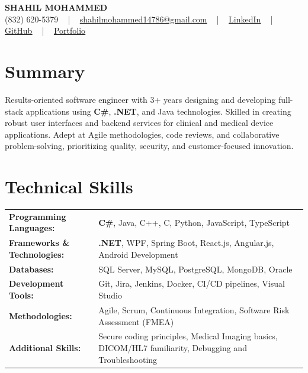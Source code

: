\documentclass[letterpaper,11pt]{article}
\begin{document}
\begin{center}
    {\fontsize{14pt}{12pt}\selectfont \textbf{\MakeUppercase{Shahil Mohammed}}}\\ \vspace{2pt}
    \fontsize{10pt}{12pt}\selectfont (832) 620-5379 ~ | ~ \href{mailto:shahilmohammed14786@gmail.com}{shahilmohammed14786@gmail.com} ~ | ~  
    \href{https://www.linkedin.com/in/shahil-mohammed-9652931a1/}{\color{blue}\underline{LinkedIn}}  ~ | ~ 
    \href{https://github.com/freakbeast14}{\color{blue}\underline{GitHub}} ~ | ~ 
    \href{https://shahil-mohammed.netlify.app/}{\color{blue}\underline{Portfolio}}
    \vspace{-8pt}
\end{center}

\section{Summary}
\fontsize{9pt}{10pt}\selectfont
Results-oriented software engineer with 3+ years designing and developing full-stack applications using \textbf{C\#}, \textbf{.NET}, and Java technologies. Skilled in creating robust user interfaces and backend services for clinical and medical device applications. Adept at Agile methodologies, code reviews, and collaborative problem-solving, prioritizing quality, security, and customer-focused innovation.
 \vspace{-5pt}
 
\section{Technical Skills}
        \vspace{-14pt}
        \begin{table}[h]
            \fontsize{9pt}{10pt}\selectfont
            \begin{tabular}{p{0.3\linewidth} p{0.7\linewidth}}
                \textbf{Programming Languages:} & \textbf{C\#}, Java, C++, C, Python, JavaScript, TypeScript \\
                \textbf{Frameworks \& Technologies:} & \textbf{.NET}, WPF, Spring Boot, React.js, Angular.js, Android Development \\
                \textbf{Databases:} & SQL Server, MySQL, PostgreSQL, MongoDB, Oracle \\
                \textbf{Development Tools:} & Git, Jira, Jenkins, Docker, CI/CD pipelines, Visual Studio \\
                \textbf{Methodologies:} & Agile, Scrum, Continuous Integration, Software Risk Assessment (FMEA) \\
                \textbf{Additional Skills:} & Secure coding principles, Medical Imaging basics, DICOM/HL7 familiarity, Debugging and Troubleshooting \\
            \end{tabular}
        \end{table}
 \vspace{-15pt}
 
\end{document}
